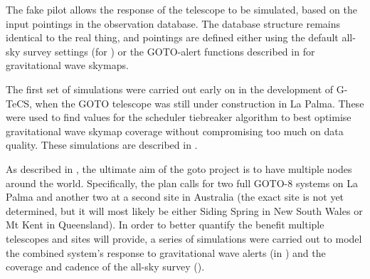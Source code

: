 \begin{colsection}
\begin{colsection}
The fake pilot allows the response of the telescope to be simulated, based on the input pointings in the observation database. The database structure remains identical to the real thing, and pointings are defined either using the default all-sky survey settings (for ) or the GOTO-alert functions described in  for gravitational wave skymaps.

The first set of simulations were carried out early on in the development of G-TeCS, when the GOTO telescope was still under construction in La Palma. These were used to find values for the scheduler tiebreaker algorithm to best optimise gravitational wave skymap coverage without compromising too much on data quality. These simulations are described in .

As described in , the ultimate aim of the \gls{goto} project is to have multiple nodes around the world. Specifically, the plan calls for two full GOTO-8 systems on La Palma and another two at a second site in Australia (the exact site is not yet determined, but it will most likely be either Siding Spring in New South Wales or Mt Kent in Queensland). In order to better quantify the benefit multiple telescopes and sites will provide, a series of simulations were carried out to model the combined system's response to gravitational wave alerts (in ) and the coverage and cadence of the all-sky survey ().

\end{colsection}


\end{colsection}


\newpage
